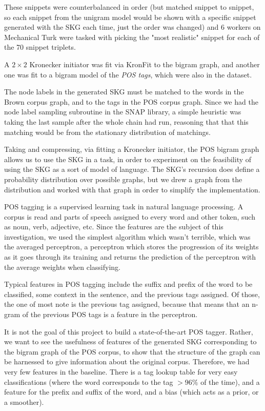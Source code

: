 \documentclass[12pt]{article}
\begin{document}
These snippets were counterbalanced in order (but matched snippet to snippet, so each snippet from the unigram model would be shown with a specific snippet generated with the SKG each time, just the order was changed) and 6 workers on Mechanical Turk were tasked with picking the "most realistic" snippet for each of the 70 snippet triplets.

A $2 \times 2$ Kronecker initiator was fit via KronFit to the bigram graph, and another one was fit to a bigram model of the \emph{POS tags}, which were also in the dataset. %

The node labels in the generated SKG must be matched to the words in the Brown corpus graph, and to the tags in the POS corpus graph. Since we had the node label sampling subroutine in the SNAP library, a simple heuristic was taking the last sample after the whole chain had run, reasoning that that this matching would be from the stationary distribution of matchings.

Taking and compressing, via fitting a Kronecker initiator, the POS bigram graph allows us to use the SKG in a task, in order to experiment on the feasibility of using the SKG as a sort of model of language. The SKG's recursion does define a probability distribution over possible graphs, but we drew a graph from the distribution and worked with that graph in order to simplify the implementation.

POS tagging is a supervised learning task in natural language processing. A corpus is read and parts of speech assigned to every word and other token, such as noun, verb, adjective, etc. Since the features are the subject of this investigation, we used the simplest algorithm which wasn't terrible, which was the averaged perceptron, a perceptron which stores the progression of its weights as it goes through its training and returns the prediction of the perceptron with the average weights when classifying. %

Typical features in POS tagging include the suffix and prefix of the word to be classified, some context in the sentence, and the previous tags assigned. Of those, the one of most note is the previous tag assigned, because that means that an n-gram of the previous POS tags is a feature in the perceptron. %

It is not the goal of this project to build a state-of-the-art POS tagger. Rather, we want to see the usefulness of features of the generated SKG corresponding to the bigram graph of the POS corpus, to show that the structure of the graph can be harnessed to give information about the original corpus. Therefore, we had very few features in the baseline. There is a tag lookup table for very easy classifications (where the word corresponds to the tag $>96\%$ of the time), and a feature for the prefix and suffix of the word, and a bias (which acts as a prior, or a smoother).
\end{document}
